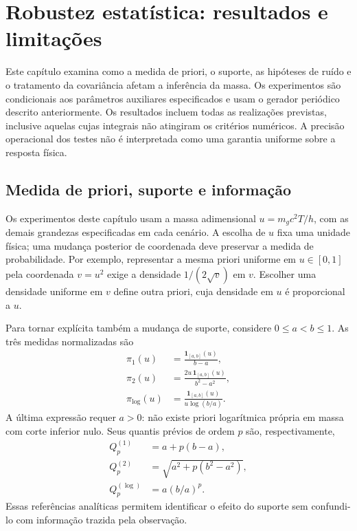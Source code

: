 \chapter[Robustez estatística]{Robustez estatística: resultados e limitações}
\label{chap:robustez}

Este capítulo examina como a medida de priori, o suporte, as hipóteses de ruído e o tratamento da covariância afetam a inferência da massa. Os experimentos são condicionais aos parâmetros auxiliares especificados e usam o gerador periódico descrito anteriormente. Os resultados incluem todas as realizações previstas, inclusive aquelas cujas integrais não atingiram os critérios numéricos. A precisão operacional dos testes não é interpretada como uma garantia uniforme sobre a resposta física.

\section{Medida de priori, suporte e informação}
\label{sec:c09-medida}

Os experimentos deste capítulo usam a massa adimensional
\(u=m_g c^2T/h\), com as demais grandezas especificadas em cada cenário.
A escolha de \(u\) fixa uma unidade física; uma mudança posterior de coordenada
deve preservar a medida de probabilidade. Por exemplo, representar a mesma
priori uniforme em \(u\in[0,1]\) pela coordenada \(v=u^2\) exige a densidade
\(1/(2\sqrt v)\) em \(v\). Escolher uma densidade uniforme em \(v\)
define outra priori, cuja densidade em \(u\) é proporcional a \(u\).

Para tornar explícita também a mudança de suporte, considere
\(0\leq a<b\leq1\). As três medidas normalizadas são
\begin{equation}
 \begin{aligned}
 \pi_1(u)&=\frac{\mathbf 1_{[a,b]}(u)}{b-a},\\
 \pi_2(u)&=\frac{2u\,\mathbf 1_{[a,b]}(u)}{b^2-a^2},\\
 \pi_{\log}(u)&=\frac{\mathbf 1_{[a,b]}(u)}{u\log(b/a)}.
 \end{aligned}
 \label{eq:c09-prioris}
\end{equation}
A última expressão requer \(a>0\): não existe priori logarítmica própria
em massa com corte inferior nulo. Seus quantis prévios de ordem \(p\) são,
respectivamente,
\begin{equation}
 \begin{aligned}
 Q_p^{(1)}&=a+p(b-a),\\
 Q_p^{(2)}&=\sqrt{a^2+p(b^2-a^2)},\\
 Q_p^{(\log)}&=a(b/a)^p.
 \end{aligned}
 \label{eq:c09-quantis-prioris}
\end{equation}
Essas referências analíticas permitem identificar o efeito do suporte sem
confundi-lo com informação trazida pela observação.

